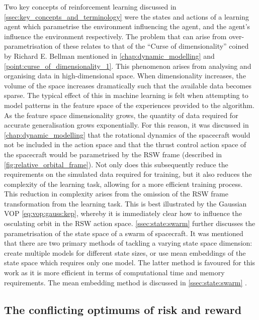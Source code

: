 Two key concepts of reinforcement learning discussed in \autoref{ssec:key_concepts_and_terminology} were the states and actions of a learning agent which parametrise the environment influencing the agent, and the agent's influence the environment respectively. The problem that can arise from over-parametrisation of these relates to that of the ``Curse of dimensionality'' coined by Richard E. Bellman mentioned in \autoref{chap:dynamic_modelling} and \autoref{point:curse_of_dimensionality_1}. This phenomenon arises from analysing and organising data in high-dimensional space. When dimensionality increases, the volume of the space increases dramatically such that the available data becomes sparse. The typical effect of this in machine learning is felt when attempting to model patterns in the feature space of the experiences provided to the algorithm. As the feature space dimensionality grows, the quantity of data required for accurate generalisation grows exponentially. For this reason, it was discussed in \autoref{chap:dynamic_modelling} that the rotational dynamics of the spacecraft would not be included in the action space and that the thrust control action space of the spacecraft would be parametrised by the RSW frame (described in \autoref{fig:relative_orbital_frame}). Not only does this subsequently reduce the requirements on the simulated data required for training, but it also reduces the complexity of the learning task, allowing for a more efficient training process. This reduction in complexity arises from the omission of the RSW frame transformation from the learning task. This is best illustrated by the Gaussian \gls{VOP} \autoref{eq:vop:gauss:kep}, whereby it is immediately clear how to influence the osculating orbit in the RSW action space. \autoref{ssec:state:swarm} further discusses the parametrisation of the state space of a swarm of spacecraft. It was mentioned that there are two primary methods of tackling a varying state space dimension: create multiple models for different state sizes, or use mean embeddings of the state space which requires only one model. The latter method is favoured for this work as it is more efficient in terms of computational time and memory requirements. The mean embedding method is discussed in \autoref{ssec:state:swarm} \cite{Huttenrauch2018}.


\subsection{The conflicting optimums of risk and reward}\label{ssec:insight:conflicting-optimums}

